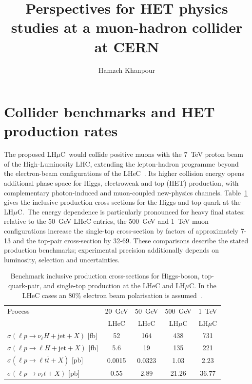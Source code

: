 \documentclass[a4paper,11pt]{article}
\title{Perspectives for HET physics studies at a muon-hadron collider at CERN}
\author*[]{Hamzeh Khanpour}
\affiliation[]{AGH University of Krakow, Faculty of Physics and Applied Computer Science,
Al. Mickiewicza 30, 30-055 Krak\'ow, Poland.}
\newcommand{\lhmuc}{LH$\mu$C}
\begin{document}
\maketitle


\section{Collider benchmarks and HET production rates}\label{sec:setup}


The proposed \lhmuc\ would collide positive muons with the 7~TeV proton beam of 
the High-Luminosity LHC, extending the lepton-hadron programme beyond the 
electron-beam configurations of the LHeC~\cite{Akturk:2025ubm,LHeC:2020van,Ahmadova:2025vzd}. 
Its higher collision energy opens additional phase space for Higgs, 
electroweak and top (HET) production, with complementary photon-induced and muon-coupled 
new-physics channels.      
Table~\ref{tab:rates} gives the inclusive production cross-sections for the Higgs and top-quark at the \lhmuc.\ 
The energy dependence is particularly pronounced for heavy final states:  
relative to the 50~GeV LHeC entries, the 500~GeV and 1~TeV muon configurations 
increase the single-top cross-section by factors of approximately 7-13 and the 
top-pair cross-section by 32-69. These comparisons describe the stated production 
benchmarks; experimental precision additionally depends on luminosity, selection and uncertainties. 


\begin{table}[htbp]
\centering
\small
\setlength{\tabcolsep}{6pt}
\renewcommand{\arraystretch}{1.18}
\begin{tabular}{lcccc}
\toprule
Process & 20~GeV & 50~GeV & 500~GeV & 1~TeV\\
& LHeC & LHeC & \lhmuc & \lhmuc\\
\midrule
$\sigma(\ell p\to\nu_\ell H+\mathrm{jet}+X)$ [fb]
& 52 & 164 & 438 & 731\\
$\sigma(\ell p\to\ell H+\mathrm{jet}+X)$ [fb]
& 5.6 & 19 & 135 & 221\\
$\sigma(\ell p\to\ell t\bar t+X)$ [pb]
& 0.0015 & 0.0323 & 1.03 & 2.23\\
$\sigma(\ell p\to\nu_\ell t+X)$ [pb]
& 0.55 & 2.89 & 21.26 & 36.77\\
\bottomrule
\end{tabular}
\caption{Benchmark inclusive production cross-sections for
Higgs-boson, top-quark-pair, and single-top production at the
LHeC and \lhmuc. 
In the LHeC cases an 80\% electron beam polarisation is assumed~\cite{Andre:2025iar}.}
\label{tab:rates}
\end{table}
\end{document}
